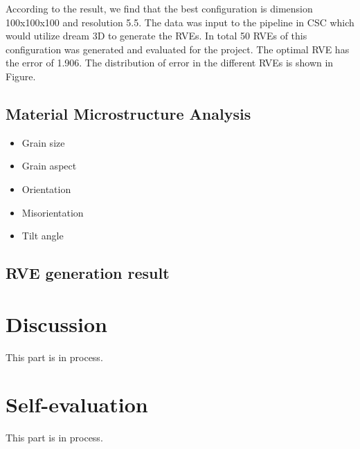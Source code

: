 According to the result, we find that the best configuration is dimension 100x100x100 and resolution 5.5. The data was input to the pipeline in CSC which would utilize dream 3D to generate the RVEs. In total 50 RVEs of this configuration was generated and evaluated for the project. The optimal RVE has the error of 1.906. The distribution of error in the different RVEs is shown in Figure.


\section{Material Microstructure Analysis}
\begin{itemize}
   \item Grain size 
    
   \item Grain aspect
    
   \item Orientation

   \item Misorientation

   \item Tilt angle
    
\end{itemize}


\section{RVE generation result}



\chapter{Discussion}
This part is in process.

\chapter{Self-evaluation}
This part is in process.
\renewcommand{\bibname}{Reference}







